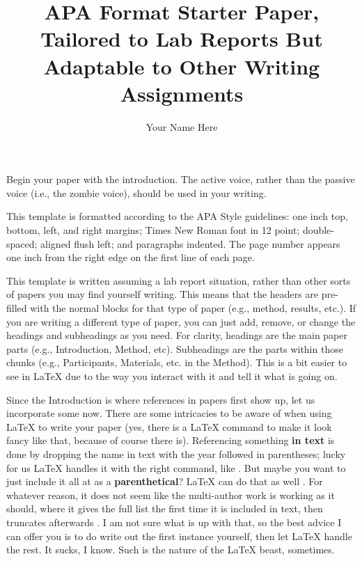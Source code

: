 \documentclass[stu,12pt,floatsintext]{apa7}
\title{APA Format Starter Paper, Tailored to Lab Reports But Adaptable to Other Writing Assignments} %
\author{Your Name Here}
\affiliation{Your School}
\begin{document}
\maketitle %


Begin your paper with the introduction. The active voice, rather than the passive voice (i.e., the zombie voice), should be used in your writing.

This template is formatted according to the APA Style guidelines: one inch top, bottom, left, and right margins; Times New Roman font in 12 point; double-spaced; aligned flush left; and paragraphs indented. The page number appears one inch from the right edge on the first line of each page.

This template is written assuming a lab report situation, rather than other sorts of papers you may find yourself writing. This means that the headers are pre-filled with the normal blocks for that type of paper (e.g., method, results, etc.). If you are writing a different type of paper, you can just add, remove, or change the headings and subheadings as you need. For clarity, headings are the main paper parts (e.g., Introduction, Method, etc). Subheadings are the parts within those chunks (e.g., Participants, Materials, etc. in the Method). This is a bit easier to see in \LaTeX{} due to the way you interact with it and tell it what is going on.

Since the Introduction is where references in papers first show up, let us incorporate some now. There are some intricacies to be aware of when using \LaTeX{} to write your paper (yes, there is a \LaTeX{} command to make it look fancy like that, because of course there is). Referencing something \textbf{in text} is done by dropping the name in text with the year followed in parentheses; lucky for us \LaTeX{} handles it with the right command, like  \textcite{Sample2024}. But maybe you want to just include it all at as a \textbf{parenthetical}? \LaTeX{} can do that as well \parencite{FullBook2021}. %
For whatever reason, it does not seem like the multi-author work \parencite[e.g.,][]{Multiauthor2020} is working as it should, where it gives the full list the first time it is included in text, then truncates afterwards \parencite{Multiauthor2020}. I am not sure what is up with that, so the best advice I can offer you is to do write out the first instance yourself, then let \LaTeX{} handle the rest. It sucks, I know. Such is the nature of the \LaTeX{} beast, sometimes.
\end{document}
